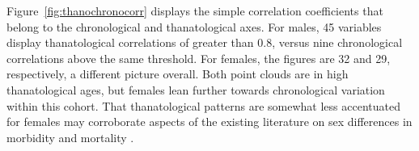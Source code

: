 \documentclass[11pt,oneside]{article} %
\begin{document}
\begin{figure}[!h]
{\begin{subfigure}{.7\textwidth}
	\end{subfigure}
	}
\end{figure}
	
Figure~\ref{fig:thanochronocorr} displays the simple correlation coefficients
that belong to the chronological and thanatological axes. For males, 45
variables display thanatological correlations of greater than 0.8, versus nine chronological
correlations above the same threshold. For females, the figures are 32 and 29,
respectively, a different picture overall. Both point clouds are in high
thanatological ages, but females lean further towards chronological variation
within this cohort. That thanatological patterns are somewhat less accentuated for females may
corroborate aspects of the existing literature on sex differences in morbidity and mortality \citep{case2005sex}.
	
\end{document}

